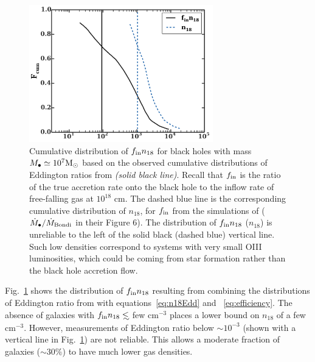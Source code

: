 \documentclass[usenatbib,fleqn]{mnras}
\newcommand\lsim{\mathrel{\rlap{\lower4pt\hbox{\hskip1pt$\sim$}}
    \raise1pt\hbox{$<$}}}
\newcommand{\Mbh}[1][]{M_{\bullet#1}}
\newcommand{\Msun}{{\rm M_\odot}}
\begin{document}
\begin{figure}
\includegraphics[width=8cm]{fcum_n18.pdf}
\caption{\label{fig:n18Cum} Cumulative distribution of $f_{\rm in}
  n_{18}$ for black holes with mass $\Mbh\simeq 10^{7} \Msun$ based on
  the observed cumulative distributions of Eddington ratios from
  \citet{Kauffmann&Heckman2009} {\it (solid black line)}. Recall that
  $f_{\rm in}$ is the ratio of the true accretion rate onto the black
  hole to the inflow rate of free-falling gas at $10^{18}$ cm.  The
  dashed blue line is the corresponding cumulative distribution of
  $n_{18}$, for $f_{\rm in}$ from the simulations of \citet{Li+2013}
  ($\dot{M}_{\bullet}/\dot{M}_{\rm Bondi}$ in their Figure 6). The
  distribution of $f_{\rm in} n_{18}$ ($n_{18}$) is unreliable to the
  left of the solid black (dashed blue) vertical line. Such low
  densities correspond to systems with very small OIII luminosities,
  which could be coming from star formation rather than the black hole
  accretion flow.}
\end{figure}


Fig.~\ref{fig:n18Cum} shows the distribution of $f_{\rm in} n_{18}$
resulting from combining the distributions of Eddington ratio from
\citet{Kauffmann&Heckman2009} with equations~\eqref{eq:n18Edd} and
~\eqref{eq:efficiency}.  The absence of galaxies with $f_{\rm in
}n_{18} \lsim$ few cm$^{-3}$ places a lower bound on $n_{18}$ of a few
cm$^{-3}$.  However, measurements of Eddington ratio below $\sim
10^{-3}$ (shown with a vertical line in Fig.~\ref{fig:n18Cum}) are not
reliable. This allows a moderate fraction of galaxies ($\sim 30\%$) to
have much lower gas densities.
\end{document}
